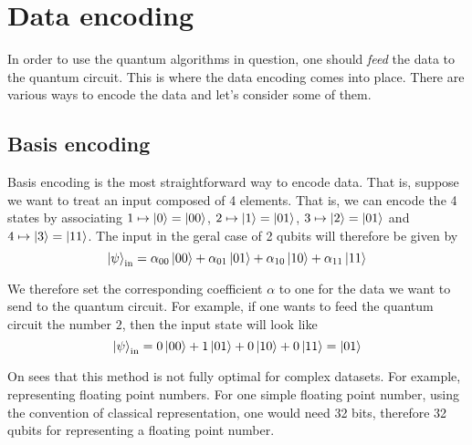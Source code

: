 \section{Data encoding}
In order to use the quantum algorithms in question, 
one should \textit{feed} the data to the quantum circuit. This is where the data encoding comes into place. 
There are various ways to encode the data and let's consider some of them.

\subsection*{Basis encoding}
Basis encoding is the most straightforward way to 
encode data. That is, suppose we want to treat an input composed of 4 elements. That is, 
we can encode the 4 states by associating $1\mapsto \ket{0} = \ket{00}$, $2\mapsto \ket{1} = \ket{01}$, 
$3\mapsto \ket{2} = \ket{01}$ and $4\mapsto \ket{3} = \ket{11}$. The input in the geral case of 2 qubits will therefore be 
given by 
\begin{equation}
  \ket{\psi}_{\text{in}} = \alpha_{00}\ket{00} + \alpha_{01}\ket{01} + \alpha_{10}\ket{10} + \alpha_{11}\ket{11}
\end{equation}

We therefore set the corresponding coefficient $\alpha $ to one for the data we want to send to the quantum 
circuit. For example, if one wants to feed the quantum circuit the number $2$, then the input state will look like 
\begin{equation}
  \ket{\psi}_{\text{in}} = 0\ket{00} + 1\ket{01} + 0\ket{10} + 0\ket{11} = \ket{01}
\end{equation}

On sees that this method is not fully optimal for complex datasets. For example, representing floating point numbers. 
For one simple floating point number, using the convention of classical representation, one would need 32 bits, therefore 
32 qubits for representing a floating point number.


